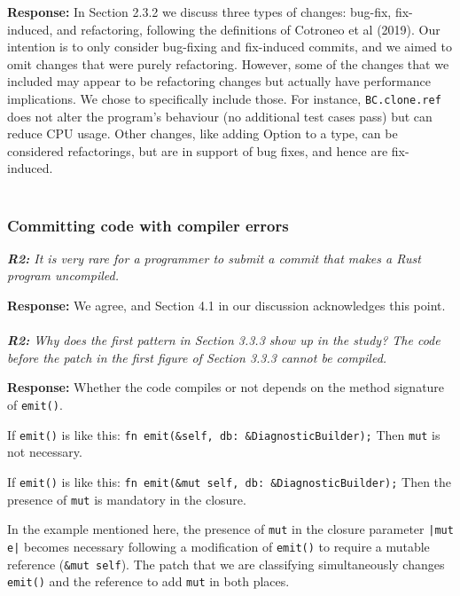 \documentclass{article}
\begin{document}
\vspace*{1em} \noindent \textbf{Response:} In Section 2.3.2 we discuss three types of changes: bug-fix, fix-induced, and refactoring, following the definitions of Cotroneo et al (2019). Our intention is to only consider bug-fixing and fix-induced commits, and we aimed to omit changes that were purely refactoring. However, some of the changes that we included may appear to be refactoring changes but actually have performance implications. We chose to specifically include those. For instance, \verb+BC.clone.ref+ does not alter the program's behaviour (no additional test cases pass) but can reduce CPU usage. Other changes, like adding Option to a type, can be considered refactorings, but are in support of bug fixes, and hence are fix-induced. \\ \\

\subsubsection{\label{rev:2:compile}Committing code with compiler errors}

\textit{\textbf{R2:} It is very rare for a programmer to submit a commit that makes a Rust program uncompiled.}

\vspace*{1em} \noindent \textbf{Response:} We agree, and Section 4.1 in our discussion acknowledges this point. \\ \\

\vspace*{1em} \noindent \textit{\textbf{R2:} Why does the first pattern in Section 3.3.3 show up in the study? The code before the patch in the first figure of Section 3.3.3 cannot be compiled.}

\vspace*{1em} \noindent \textbf{Response:} Whether the code compiles or not depends on the method signature of \verb+emit()+.

If \verb+emit()+ is like this:
    \verb+fn emit(&self, db: &DiagnosticBuilder);+
Then \verb+mut+  is not necessary.

If \verb+emit()+ is like this:
    \verb+fn emit(&mut self, db: &DiagnosticBuilder);+
Then the presence of \verb+mut+ is mandatory in the closure. 

In the example mentioned here, the presence of \verb+mut+ in the closure parameter \verb+|mut e|+ becomes necessary following a modification of \verb+emit()+ to require a mutable reference (\verb+&mut self+). The patch that we are classifying simultaneously changes \verb+emit()+ and the reference to add \verb+mut+ in both places. \\ \\
\end{document}
